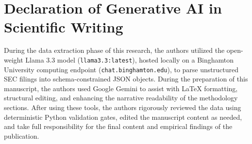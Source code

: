 \section*{Declaration of Generative AI in Scientific Writing}
During the data extraction phase of this research, the authors utilized the open-weight Llama 3.3 model (\texttt{llama3.3:latest}), hosted locally on a Binghamton University computing endpoint (\texttt{chat.binghamton.edu}), to parse unstructured SEC filings into schema-constrained JSON objects. During the preparation of this manuscript, the authors used Google Gemini to assist with LaTeX formatting, structural editing, and enhancing the narrative readability of the methodology sections. After using these tools, the authors rigorously reviewed the data using deterministic Python validation gates, edited the manuscript content as needed, and take full responsibility for the final content and empirical findings of the publication.